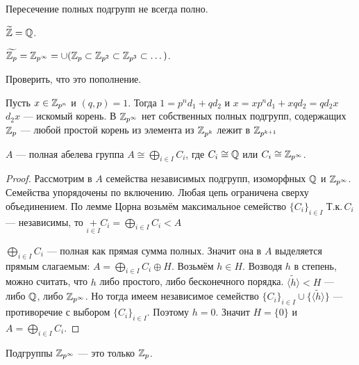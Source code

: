 \documentclass[10pt,a4paper]{article}%
\begin{document}
\begin{remark}
Пересечение полных подгрупп не всегда полно.
\end{remark}

\begin{example}$\widetilde{\mathbb Z}=\mathbb Q$.
\end{example}

\begin{example}$\widetilde{\mathbb Z_p}=\mathbb Z_{p^\infty}=\cup(\mathbb Z_p\subset\mathbb Z_{p^2}\subset\mathbb Z_{p^3}\subset
\dots)$.
\end{example}

\begin{exercise} Проверить, что это
пополнение.
\end{exercise}
\inst Пусть $x\in\mathbb Z_{p^n}$ и $(q,p)=1$.
Тогда $1=p^nd_1+qd_2$ и $x=xp^nd_1+xqd_2=qd_2x$ $d_2x$ --- искомый
корень. В $\mathbb Z_{p^\infty}$ нет собственных полных подгрупп,
содержащих $\mathbb Z_p$
--- любой простой корень из элемента из $\mathbb Z_{p^k}$ лежит в
$\mathbb Z_{p^{k+1}}$

\begin{theorem}
{$A$ --- полная абелева группа \ifif $A\cong
\bigoplus\limits_{i\in I}C_i$, где $C_i\cong\mathbb Q$ или
$C_i\cong\mathbb Z_{p^\infty}$.}\label{completeness_criterion}
\end{theorem}

\begin{proof} Рассмотрим в $A$ семейства независимых подгрупп, изоморфных
$\mathbb Q$ и $\mathbb Z_{p^\infty}$. Семейства упорядочены по включению.
Любая цепь ограничена сверху объединением. По лемме Цорна возьмём
максимальное семейство $\{C_i\}_{i\in I}$ Т.к.\,$C_i$ ---
независимы, то $\mathop+\limits_{i\in I}C_i=\bigoplus\limits_{i\in
I}C_i<A$

$\bigoplus\limits_{i\in I}C_i$ --- полная как прямая сумма полных.
Значит она в $A$ выделяется прямым слагаемым:
$A=\bigoplus\limits_{i\in I}C_i\oplus H$. Возьмём $h\in H$.
Возводя $h$ в степень, можно считать, что $h$ либо простого, либо
бесконечного порядка. $\widetilde{\langle h\rangle}<H$ --- либо
$\mathbb Q$, либо $\mathbb Z_{p^\infty}$. Но тогда имеем независимое семейство
$\{C_i\}_{i\in I}\cup\{\widetilde{\langle h\rangle}\}$ ---
противоречие с выбором $\{C_i\}_{i\in I}$. Поэтому $h=0$. Значит
$H=\{0\}$ и $A=\bigoplus\limits_{i\in I}C_i$.\end{proof}

\begin{exercise} Подгруппы $\mathbb Z_{p^\infty}$ --- это только
$\mathbb Z_p$.
\end{exercise}
\end{document}
